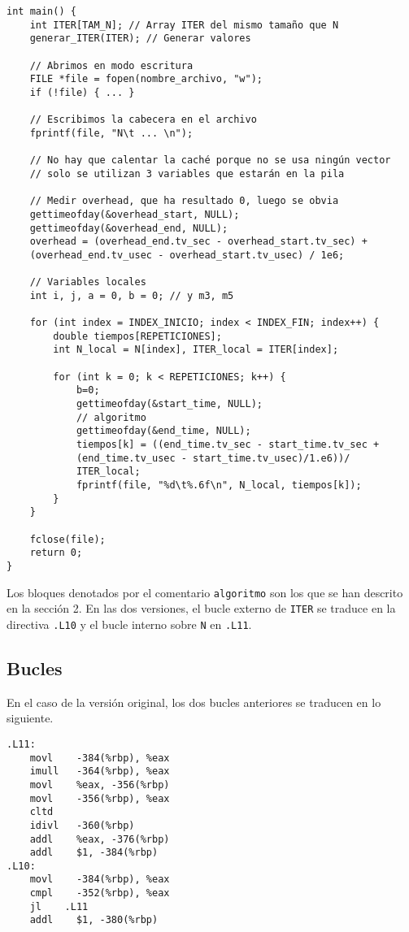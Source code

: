 \documentclass[11pt,a4paper,twoside]{article}
\theoremstyle{definition}
\begin{document}
	\begin{verbatim}
int main() {
	int ITER[TAM_N]; // Array ITER del mismo tamaño que N
	generar_ITER(ITER); // Generar valores
	
	// Abrimos en modo escritura
	FILE *file = fopen(nombre_archivo, "w"); 
	if (!file) { ... }
	
	// Escribimos la cabecera en el archivo
	fprintf(file, "N\t ... \n");
	
	// No hay que calentar la caché porque no se usa ningún vector
	// solo se utilizan 3 variables que estarán en la pila
	
	// Medir overhead, que ha resultado 0, luego se obvia
	gettimeofday(&overhead_start, NULL);
	gettimeofday(&overhead_end, NULL);
	overhead = (overhead_end.tv_sec - overhead_start.tv_sec) +
	(overhead_end.tv_usec - overhead_start.tv_usec) / 1e6;
	
	// Variables locales
	int i, j, a = 0, b = 0; // y m3, m5
	
	for (int index = INDEX_INICIO; index < INDEX_FIN; index++) {
		double tiempos[REPETICIONES];
		int N_local = N[index], ITER_local = ITER[index];
		
		for (int k = 0; k < REPETICIONES; k++) {
			b=0;
			gettimeofday(&start_time, NULL);
			// algoritmo
			gettimeofday(&end_time, NULL);
			tiempos[k] = ((end_time.tv_sec - start_time.tv_sec +
			(end_time.tv_usec - start_time.tv_usec)/1.e6))/
			ITER_local;
			fprintf(file, "%d\t%.6f\n", N_local, tiempos[k]);
		}
	}
	
	fclose(file);
	return 0;
}
	\end{verbatim}

	Los bloques denotados por el comentario \texttt{algoritmo} son los que se han descrito en la sección 2. En las dos versiones, el bucle externo de \texttt{ITER} se traduce en la directiva \texttt{.L10} y el bucle interno sobre \texttt{N} en \texttt{.L11}.

	\subsection{Bucles}
	
	En el caso de la versión original, los dos bucles anteriores se traducen en lo siguiente.
	
	\begin{verbatim}
.L11:
	movl	-384(%rbp), %eax
	imull	-364(%rbp), %eax
	movl	%eax, -356(%rbp)
	movl	-356(%rbp), %eax
	cltd
	idivl	-360(%rbp)
	addl	%eax, -376(%rbp)
	addl	$1, -384(%rbp)
.L10:
	movl	-384(%rbp), %eax
	cmpl	-352(%rbp), %eax
	jl	  .L11
	addl	$1, -380(%rbp)
	\end{verbatim}
\end{document}
